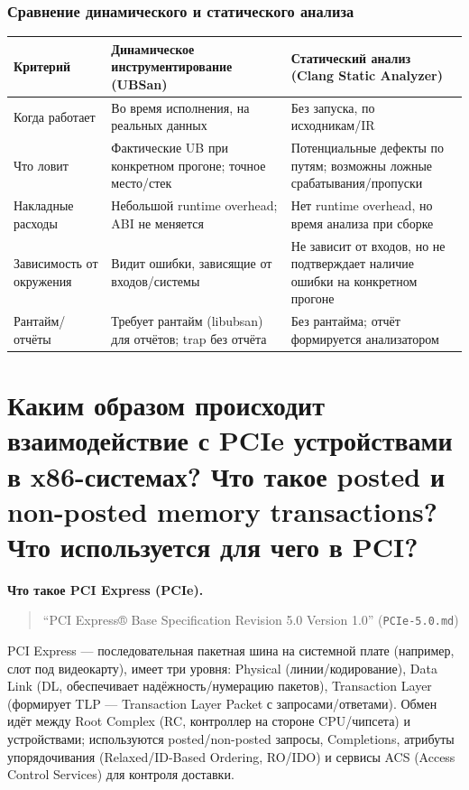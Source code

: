\documentclass[a4paper,12pt]{article}
\begin{document}
\subsubsection{Сравнение динамического и статического анализа}
\begin{center}
\begin{tabular}{|p{4.2cm}|p{5.1cm}|p{5.1cm}|}
\hline
Критерий & Динамическое инструментирование (UBSan) & Статический анализ (Clang Static Analyzer) \\
\hline
Когда работает & Во время исполнения, на реальных данных & Без запуска, по исходникам/IR \\
\hline
Что ловит & Фактические UB при конкретном прогоне; точное место/стек & Потенциальные дефекты по путям; возможны ложные срабатывания/пропуски \\
\hline
Накладные расходы & Небольшой runtime overhead; ABI не меняется & Нет runtime overhead, но время анализа при сборке \\
\hline
Зависимость от окружения & Видит ошибки, зависящие от входов/системы & Не зависит от входов, но не подтверждает наличие ошибки на конкретном прогоне \\
\hline
Рантайм/отчёты & Требует рантайм (libubsan) для отчётов; trap без отчёта & Без рантайма; отчёт формируется анализатором \\
\hline
\end{tabular}
\end{center}

\section{Каким образом происходит взаимодействие с PCIe устройствами в x86-системах? Что такое posted и non-posted memory transactions? Что используется для чего в PCI?}
\textbf{Что такое PCI Express (PCIe).}
\begin{quote}
``PCI Express® Base Specification Revision 5.0 Version 1.0'' (\texttt{PCIe-5.0.md})
\end{quote}
PCI Express — последовательная пакетная шина на системной плате (например, слот под видеокарту), имеет три уровня: Physical (линии/кодирование), Data Link (DL, обеспечивает надёжность/нумерацию пакетов), Transaction Layer (формирует TLP — Transaction Layer Packet с запросами/ответами). Обмен идёт между Root Complex (RC, контроллер на стороне CPU/чипсета) и устройствами; используются posted/non-posted запросы, Completions, атрибуты упорядочивания (Relaxed/ID-Based Ordering, RO/IDO) и сервисы ACS (Access Control Services) для контроля доставки.
\end{document}
